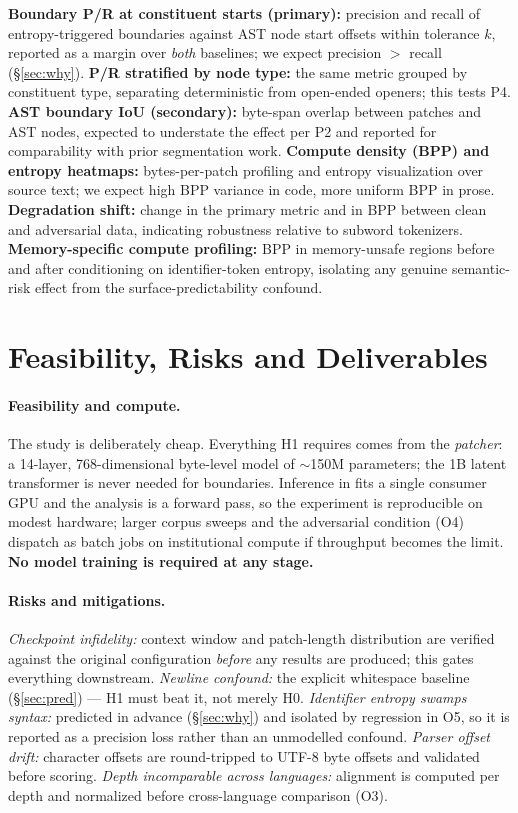 \noindent
\textbf{Boundary P/R at constituent starts (primary):} precision and recall of
entropy-triggered boundaries against AST node start offsets within tolerance $k$, reported
as a margin over \emph{both} baselines; we expect precision $>$ recall (\S\ref{sec:why}).
\textbf{P/R stratified by node type:} the same metric grouped by constituent type,
separating deterministic from open-ended openers; this tests P4. \textbf{AST boundary IoU
(secondary):} byte-span overlap between patches and AST nodes, expected to understate the
effect per P2 and reported for comparability with prior segmentation work. \textbf{Compute
density (BPP) and entropy heatmaps:} bytes-per-patch profiling and entropy visualization over
source text; we expect high BPP variance in code, more uniform BPP in prose.
\textbf{Degradation shift:} change in the primary metric and in BPP between clean and
adversarial data, indicating robustness relative to subword tokenizers.
\textbf{Memory-specific compute profiling:} BPP in memory-unsafe regions before and after
conditioning on identifier-token entropy, isolating any genuine semantic-risk effect from
the surface-predictability confound.

\section{Feasibility, Risks and Deliverables}

\paragraph{Feasibility and compute.} The study is deliberately cheap. Everything H1 requires
comes from the \emph{patcher}: a 14-layer, 768-dimensional byte-level model of ${\sim}$150M
parameters; the 1B latent transformer is never needed for boundaries. Inference in
 fits a single consumer GPU and the analysis is a forward pass, so the
experiment is reproducible on modest hardware; larger corpus sweeps and the adversarial
condition (O4) dispatch as batch jobs on institutional compute if throughput becomes the
limit. \textbf{No model training is required at any stage.}

\paragraph{Risks and mitigations.} \emph{Checkpoint infidelity:} context window and
patch-length distribution are verified against the original configuration \emph{before} any
results are produced; this gates everything downstream. \emph{Newline confound:} the explicit
whitespace baseline (\S\ref{sec:pred}) --- H1 must beat it, not merely H0. \emph{Identifier
entropy swamps syntax:} predicted in advance (\S\ref{sec:why}) and isolated by regression in
O5, so it is reported as a precision loss rather than an unmodelled confound. \emph{Parser
offset drift:} character offsets are round-tripped to UTF-8 byte offsets and validated before
scoring. \emph{Depth incomparable across languages:} alignment is computed per depth and
normalized before cross-language comparison (O3).

